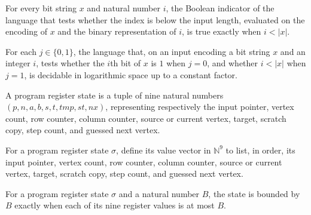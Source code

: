 \begin{lemma}
\label{Complexity.LogProg.pathOr_len}
\leanok
{}
For every bit string $x$ and natural number $i$, the Boolean indicator of the language
that tests whether the index is below the input length, evaluated on the encoding of $x$
and the binary representation of $i$, is true exactly when $i<|x|$.
\end{lemma}

\begin{lemma}
\label{Complexity.LogProg.pathAs_mem}
\leanok
{}
For each $j\in\{0,1\}$, the language that, on an input encoding a bit string $x$ and an
integer $i$, tests whether the $i$th bit of $x$ is $1$ when $j=0$, and whether $i<|x|$
when $j=1$, is decidable in logarithmic space up to a constant factor.
\end{lemma}

\begin{definition}
\label{Complexity.LogProg.PReg}
\leanok
A program register state is a tuple of nine natural numbers $(p,n,a,b,s,t,tmp,st,nx)$,
representing respectively the input pointer, vertex count, row counter, column counter,
source or current vertex, target, scratch copy, step count, and guessed next vertex.
\end{definition}

\begin{definition}
\label{Complexity.LogProg.PReg.v}
\leanok
{}
For a program register state $\sigma$, define its value vector in $\mathbb{N}^9$ to list, in order,
its input pointer, vertex count, row counter, column counter, source or current vertex,
target, scratch copy, step count, and guessed next vertex.
\end{definition}

\begin{definition}
\label{Complexity.LogProg.PReg.Le}
\leanok
{}
For a program register state $\sigma$ and a natural number $B$, the state is bounded by $B$
exactly when each of its nine register values is at most $B$.
\end{definition}

